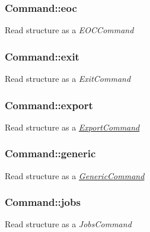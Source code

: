 \subsubsection[{\texorpdfstring{eoc}{eoc}}]{ Command\+::eoc}\hypertarget{unionCommand_a062a1645e04deb34460595c902a49c44}{}\label{unionCommand_a062a1645e04deb34460595c902a49c44}
Read structure as a {\itshape E\+O\+C\+Command} 
\subsubsection[{\texorpdfstring{exit}{exit}}]{ Command\+::exit}\hypertarget{unionCommand_ab516bde009e6b06c4b342d7f5bf35ece}{}\label{unionCommand_ab516bde009e6b06c4b342d7f5bf35ece}
Read structure as a {\itshape Exit\+Command} 
\subsubsection[{\texorpdfstring{export}{export}}]{ Command\+::export}\hypertarget{unionCommand_a57e7a8eb0763aa7105d3bc6a52e59da3}{}\label{unionCommand_a57e7a8eb0763aa7105d3bc6a52e59da3}
Read structure as a {\itshape \hyperlink{structExportCommand}{Export\+Command}} 
\subsubsection[{\texorpdfstring{generic}{generic}}]{ Command\+::generic}\hypertarget{unionCommand_a22a7dad0e3935c261a1643c8c5ea46aa}{}\label{unionCommand_a22a7dad0e3935c261a1643c8c5ea46aa}
Read structure as a {\itshape \hyperlink{structGenericCommand}{Generic\+Command}} 
\subsubsection[{\texorpdfstring{jobs}{jobs}}]{ Command\+::jobs}\hypertarget{unionCommand_abeb4905f11baf90a800fe211dd5ecdc9}{}\label{unionCommand_abeb4905f11baf90a800fe211dd5ecdc9}
Read structure as a {\itshape Jobs\+Command} 
